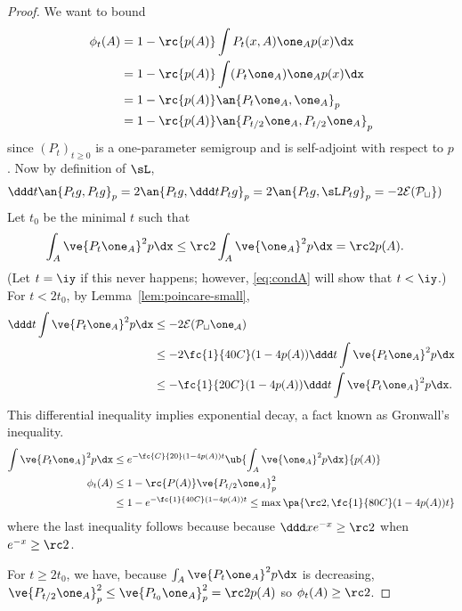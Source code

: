 \begin{proof}
We want to bound
\begin{align}
\phi_t(A) &= 1-\rc{p(A)}\int %
P_t(x,A)
\one_Ap(x)\dx\\
&=1-\rc{p(A)} \int (P_t\one_A)\one_Ap(x)\dx\\
&=1-\rc{p(A)} \an{P_t\one_A, \one_A}_p\\
&=1-\rc{p(A)} \an{P_{t/2}\one_A, P_{t/2}\one_A}_p
\end{align}
since $(P_t)_{t\ge 0}$ is a one-parameter semigroup and is self-adjoint with respect to $p$.
Now by definition of $\sL$, 
\begin{align}
\ddd t\an{P_t g, P_tg}_p &=
2\an{P_tg,\ddd tP_tg}_p 
=2\an{P_tg, \sL P_tg}_p = 
-2\cal E(P_{t}g)
\end{align}
Let $t_0$ be the minimal $t$ such that 
\begin{align}
\int_A\ve{P_t\one_A}^2 p\dx&\le \rc2 \int_A \ve{\one_A}^2p\dx = \rc2 p(A).
\end{align}
(Let $t=\iy$ if this never happens; however, \eqref{eq:condA} will show that $t<\iy$.)
For $t<2t_0$, by Lemma~\ref{lem:poincare-small},
\begin{align}
\ddd t \int\ve{P_t \one_A}^2p\dx %
&\le -2\cal E(P_t\one_A)\\
&\le -2 \fc{1}{40C}(1-4p(A)) \ddd t \int\ve{P_t \one_A}^2p\dx\\%
&\le -\fc{1}{20C}(1-4p(A)) \ddd t \int\ve{P_t \one_A}^2p\dx.
\end{align}
This differential inequality implies exponential decay, a fact known as Gronwall's inequality.
\begin{align}
\int\ve{P_t \one_A}^2p\dx &\le e^{-\fc{C}{20}(1-4p(A))t}\ub{\int_A\ve{\one_A}^2p\dx}{p(A)}\\
\phi_t(A)&\le 1-\rc{P(A)} \ve{P_{t/2}\one_A}_p^2\\
&\le 1-e^{-\fc{1}{40C}(1-4p(A))t}\le \max\pa{\rc2, \fc{1}{80C}(1-4p(A))t}\label{eq:condA}
\end{align}
where the last inequality follows because
because $\ddd xe^{-x}\ge \rc 2$ when $e^{-x}\ge \rc 2$.

For $t\ge 2t_0$, we have, because $\int_A\ve{P_t\one_A}^2p\dx$ is decreasing, $\ve{P_{t/2}\one_A}_p^2\le 
\ve{P_{t_0}\one_A}_p^2=
\rc 2p(A)$ so $\phi_t(A)\ge \rc 2$.
\end{proof}

